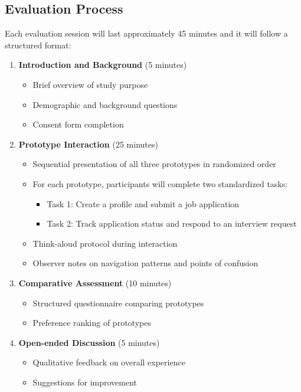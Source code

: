 \documentclass[
	letterpaper, %
]{jdf}
\begin{document}
\begin{sloppypar}
\subsection{Evaluation Process}

Each evaluation session will last approximately 45 minutes and it will follow a structured format:

\begin{enumerate}
    \item \textbf{Introduction and Background} (5 minutes)
    \begin{itemize}
        \item Brief overview of study purpose
        \item Demographic and background questions
        \item Consent form completion
    \end{itemize}
    
    \item \textbf{Prototype Interaction} (25 minutes)
    \begin{itemize}
        \item Sequential presentation of all three prototypes in randomized order
        \item For each prototype, participants will complete two standardized tasks:
        \begin{itemize}
            \item Task 1: Create a profile and submit a job application
            \item Task 2: Track application status and respond to an interview request
        \end{itemize}
        \item Think-aloud protocol during interaction
        \item Observer notes on navigation patterns and points of confusion
    \end{itemize}
    
    \item \textbf{Comparative Assessment} (10 minutes)
    \begin{itemize}
        \item Structured questionnaire comparing prototypes
        \item Preference ranking of prototypes
    \end{itemize}
    
    \item \textbf{Open-ended Discussion} (5 minutes)
    \begin{itemize}
        \item Qualitative feedback on overall experience
        \item Suggestions for improvement
    \end{itemize}
\end{enumerate}


\end{sloppypar}
\end{document}
